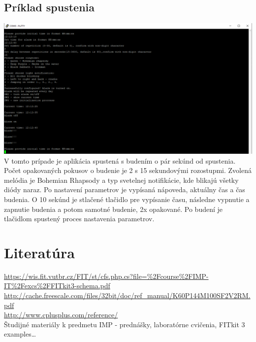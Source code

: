 \documentclass{article}
\begin{document}
        \subsection{Príklad spustenia}
            \includegraphics[width=15cm]{example.png}\\
            V tomto prípade je aplikácia spustená s budením o pár sekúnd od spustenia. Počet opakovaných pokusov o budenie je 2 s 15 sekundovými rozostupmi.
            Zvolená melódia je Bohemian Rhapsody a typ svetelnej notifikácie, kde blikajú všetky diódy naraz. Po nastavení parametrov je vypísaná nápoveda,
            aktuálny čas a čas budenia. O 10 sekúnd je stlačené tlačidlo pre vypísanie času, následne vypnutie a zapnutie budenia a potom samotné budenie, 2x opakované.
            Po budení je tlačidlom spustený proces nastavenia parametrov.
    
    \newpage
    
    \section{Literatúra}
    \noindent
    \url{https://wis.fit.vutbr.cz/FIT/st/cfs.php.cs?file=%2Fcourse%2FIMP-IT%2Fexcs%2FFITkit3-schema.pdf}\\
    \url{http://cache.freescale.com/files/32bit/doc/ref\_manual/K60P144M100SF2V2RM.pdf}\\
    \url{http://www.cplusplus.com/reference/}\\
    Študijné materiály k predmetu IMP - prednášky, laboratórne cvičenia, FITkit 3 examples\ldots\\
\end{document}
